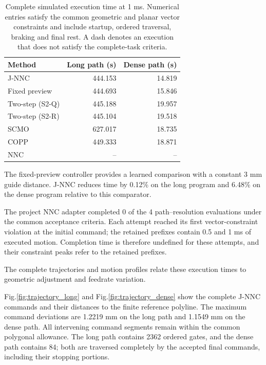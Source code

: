 \documentclass[preprint,12pt]{elsarticle}
\begin{document}
\begin{table}[htbp]
\centering
\caption{Complete simulated execution time at 1 ms. Numerical entries satisfy the common geometric and planar vector constraints and include startup, ordered traversal, braking and final rest. A dash denotes an execution that does not satisfy the complete-task criteria.}
\label{tab:complete_times}
\small
\begin{tabular}{lrr}
\toprule
Method & Long path (s) & Dense path (s) \\
\midrule
J-NNC & 444.153 & 14.819 \\
Fixed preview & 444.693 & 15.846 \\
Two-step (S2-Q) & 445.188 & 19.957 \\
Two-step (S2-R) & 445.104 & 19.518 \\
SCMO & 627.017 & 18.735 \\
COPP & 449.333 & 18.871 \\
NNC & -- & -- \\
\bottomrule
\end{tabular}
\end{table}


The fixed-preview controller provides a learned comparison with a constant 3 mm guide distance. J-NNC reduces time by 0.12\% on the long program and 6.48\% on the dense program relative to this comparator.

The project NNC adapter completed 0 of the 4 path--resolution evaluations under the common acceptance criteria. Each attempt reached its first vector-constraint violation at the initial command; the retained prefixes contain 0.5 and 1 ms of executed motion. Completion time is therefore undefined for these attempts, and their constraint peaks refer to the retained prefixes.


The complete trajectories and motion profiles relate these execution times to geometric adjustment and feedrate variation.

Fig.\nobreakspace\ref{fig:trajectory_long} and Fig.\nobreakspace\ref{fig:trajectory_dense} show the complete J-NNC commands and their distances to the finite reference polyline. The maximum command deviations are 1.2219{} mm on the long path and 1.1549{} mm on the dense path. All intervening command segments remain within the common polygonal allowance. The long path contains 2362{} ordered gates, and the dense path contains 84{}; both are traversed completely by the accepted final commands, including their stopping portions.
\end{document}
